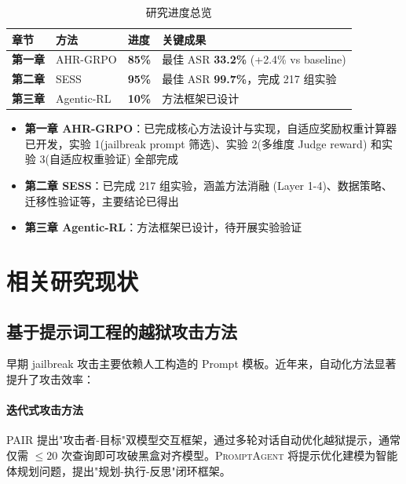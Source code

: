 \documentclass[12pt,a4paper]{article}
\newcommand{\highlight}[1]{\textcolor{primaryblue}{\textbf{#1}}}
\newcommand{\success}[1]{\textcolor{successgreen}{#1}}
\newcommand{\PAIR}{\textsc{PAIR}}
\begin{document}
\begin{table}[H]
    \centering
    \begin{tabular}{@{}l l l l@{}}
        \toprule
        \rowcolor{tableheader}
        \textbf{章节} & \textbf{方法} & \textbf{进度} & \textbf{关键成果} \\
        \midrule
        \textbf{第一章} & AHR-GRPO & \highlight{85\%} & \success{最佳 ASR \textbf{33.2\%} (+2.4\% vs baseline)} \\
        \textbf{第二章} & SESS & \highlight{95\%} & \success{最佳 ASR \textbf{99.7\%}，完成 217 组实验} \\
        \textbf{第三章} & Agentic-RL & \highlight{10\%} & 方法框架已设计 \\
        \bottomrule
    \end{tabular}
    \caption{研究进度总览}
    \label{tab:progress}
\end{table}

\begin{itemize}
    \item \highlight{第一章 AHR-GRPO}：已完成核心方法设计与实现，自适应奖励权重计算器已开发，实验 1(jailbreak prompt 筛选)、实验 2(多维度 Judge reward) 和实验 3(自适应权重验证) 全部完成
    \item \highlight{第二章 SESS}：已完成 217 组实验，涵盖方法消融 (Layer 1-4)、数据策略、迁移性验证等，主要结论已得出
    \item \highlight{第三章 Agentic-RL}：方法框架已设计，待开展实验验证
\end{itemize}

\section{相关研究现状}

\subsection{基于提示词工程的越狱攻击方法}

早期 jailbreak 攻击主要依赖人工构造的 Prompt 模板\cite{chao2023jailbreaking}。近年来，自动化方法显著提升了攻击效率：

\paragraph{迭代式攻击方法}
\PAIR\cite{chao2023jailbreaking} 提出"攻击者-目标"双模型交互框架，通过多轮对话自动优化越狱提示，通常仅需 $\leq 20$ 次查询即可攻破黑盒对齐模型。\textsc{PromptAgent}\cite{wang2024promptagent} 将提示优化建模为智能体规划问题，提出"规划-执行-反思"闭环框架。
\end{document}

